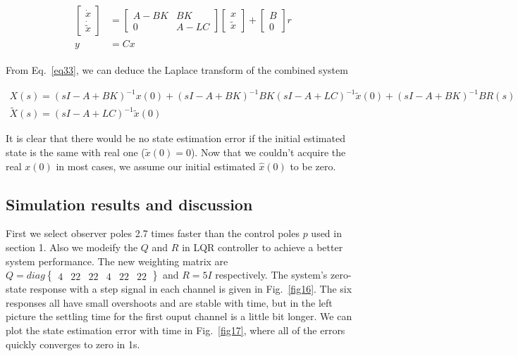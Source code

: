 \documentclass[hyperref]{article}
\theoremstyle{nonumberplain}
\begin{document}
	\begin{equation}
	\begin{split}
	\begin{aligned}
		\begin{bmatrix}
		\dot{x}\\ \dot{\tilde{x}}
		\end{bmatrix}&=\begin{bmatrix}
		A-BK &BK \\ 
		0 &A-LC 
		\end{bmatrix}
		\begin{bmatrix}
		x\\\tilde{x} 
		\end{bmatrix}+
		\begin{bmatrix}
		B\\0 	
		\end{bmatrix}r
		\\
		y&=Cx
	\label{eq33}
	\end{aligned}
	\end{split}
	\end{equation}
	
	From Eq.~\ref{eq33}, we can deduce the Laplace transform of the combined system
	
	\begin{gather}
	X(s)=(sI-A+BK)^{-1}x(0)+(sI-A+BK)^{-1}BK(sI-A+LC)^{-1}\tilde{x}(0)+(sI-A+BK)^{-1}BR(s) \nonumber\\
	\tilde{X}(s)=(sI-A+LC)^{-1}\tilde{x}(0)
	\label{eq34}
	\end{gather}
	
	It is clear that there would be no state estimation error if the initial estimated state is the same with real one ($\tilde{x}(0)=0$). Now that we couldn't acquire the real $x(0)$ in most cases, we assume our initial estimated $\hat{x}(0)$ to be zero.
	
	
	\subsection{Simulation results and discussion}
	
	\hspace{1.0em}
	First we select observer poles 2.7 times faster than the control poles $p$ used in section 1. Also we modeify the $Q$ and $R$ in LQR controller to achieve a better system performance. The new weighting matrix are $Q=diag\begin{Bmatrix}
	4&  22&  22&  4&  22&22 
	\end{Bmatrix}$ and $R=5I$ respectively. The system's zero-state response with a step signal in each channel is given in Fig.~\ref{fig16}. The six responses all have small overshoots and are stable with time, but in the left picture the settling time for the first ouput channel is a little bit longer. We can plot the state estimation error with time in Fig.~\ref{fig17}, where all of the errors quickly converges to zero in 1s.
	
\end{document}
